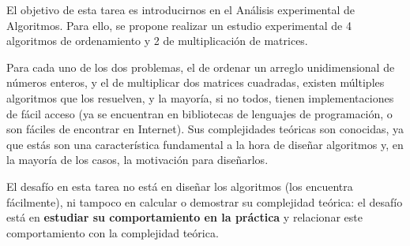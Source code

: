 El objetivo de esta tarea es introducirnos en el Análisis experimental de Algoritmos. Para ello, se propone realizar un estudio experimental de 4 algoritmos de ordenamiento y 2 de multiplicación de matrices.

Para cada uno de los dos problemas, el de ordenar un arreglo unidimensional de números enteros, y el de multiplicar dos matrices cuadradas, existen múltiples algoritmos que los resuelven, y la mayoría, si no todos, tienen
implementaciones de fácil acceso (ya se encuentran en bibliotecas de lenguajes de programación, o son fáciles de
encontrar en Internet). Sus complejidades teóricas son conocidas, ya que estás son una característica fundamental
a la hora de diseñar algoritmos y, en la mayoría de los casos, la motivación para diseñarlos.

El desafío en esta tarea no está en diseñar los algoritmos (los encuentra fácilmente), ni tampoco en calcular o demostrar su complejidad teórica: el desafío está en \textbf{estudiar su comportamiento en la práctica} y relacionar este comportamiento con la complejidad
teórica.